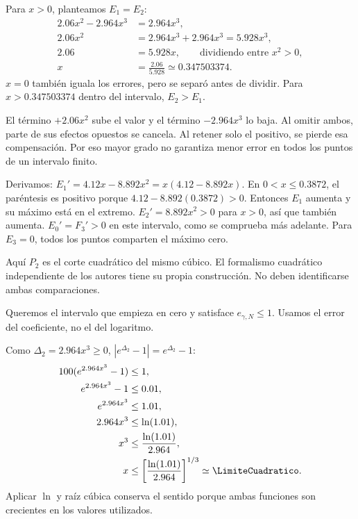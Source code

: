 Para $x>0$, planteamos $E_1=E_2$:
\begin{align*}
2.06x^2-2.964x^3&=2.964x^3,\\
2.06x^2&=2.964x^3+2.964x^3=5.928x^3,\\
2.06&=5.928x,\qquad \text{dividiendo entre }x^2>0,\\
x&=\frac{2.06}{5.928}\simeq0.347503374.
\end{align*}
$x=0$ también iguala los errores, pero se separó antes de dividir. Para $x>0.347503374$ dentro del intervalo, $E_2>E_1$.

El término $+2.06x^2$ sube el valor y el término $-2.964x^3$ lo baja. Al omitir ambos, parte de sus efectos opuestos se cancela. Al retener solo el positivo, se pierde esa compensación. Por eso mayor grado no garantiza menor error en todos los puntos de un intervalo finito.

Derivamos: $E_1'=4.12x-8.892x^2=x(4.12-8.892x)$. En $0<x\leq0.3872$, el paréntesis es positivo porque $4.12-8.892(0.3872)>0$. Entonces $E_1$ aumenta y su máximo está en el extremo. $E_2'=8.892x^2>0$ para $x>0$, así que también aumenta. $E_0'=F_3'>0$ en este intervalo, como se comprueba más adelante. Para $E_3=0$, todos los puntos comparten el máximo cero.

Aquí $P_2$ es el corte cuadrático del mismo cúbico. El formalismo cuadrático independiente de los autores tiene su propia construcción. No deben identificarse ambas comparaciones.

Queremos el intervalo que empieza en cero y satisface $e_{\gamma,N}\leq1$. Usamos el error del coeficiente, no el del logaritmo.

Como $\Delta_2=2.964x^3\geq0$, $|e^{\Delta_2}-1|=e^{\Delta_2}-1$:
\begin{align*}
100(e^{2.964x^3}-1)&\leq1,\\
e^{2.964x^3}-1&\leq0.01,\\
e^{2.964x^3}&\leq1.01,\\
2.964x^3&\leq\ln(1.01),\\
x^3&\leq\frac{\ln(1.01)}{2.964},\\
x&\leq\left[\frac{\ln(1.01)}{2.964}\right]^{1/3}\simeq\LimiteCuadratico.
\end{align*}
Aplicar $\ln$ y raíz cúbica conserva el sentido porque ambas funciones son crecientes en los valores utilizados.

